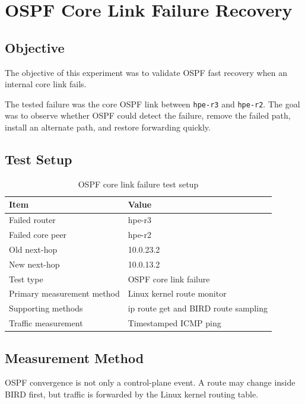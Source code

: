 \section{OSPF Core Link Failure Recovery}

\subsection{Objective}

The objective of this experiment was to validate OSPF fast recovery when an internal core link fails.

The tested failure was the core OSPF link between \texttt{hpe-r3} and \texttt{hpe-r2}. The goal was to observe whether OSPF could detect the failure, remove the failed path, install an alternate path, and restore forwarding quickly.

\subsection{Test Setup}

\begin{table}[h]
\centering
\begin{tabular}{|l|l|}
\hline
\textbf{Item} & \textbf{Value} \\
\hline
Failed router & hpe-r3 \\
\hline
Failed core peer & hpe-r2 \\
\hline
Old next-hop & 10.0.23.2 \\
\hline
New next-hop & 10.0.13.2 \\
\hline
Test type & OSPF core link failure \\
\hline
Primary measurement method & Linux kernel route monitor \\
\hline
Supporting methods & ip route get and BIRD route sampling \\
\hline
Traffic measurement & Timestamped ICMP ping \\
\hline
\end{tabular}
\caption{OSPF core link failure test setup}
\end{table}

\subsection{Measurement Method}

OSPF convergence is not only a control-plane event. A route may change inside BIRD first, but traffic is forwarded by the Linux kernel routing table.

